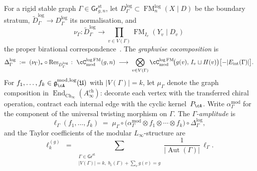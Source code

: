 \begin{construction}
\label{const:vol1-graphwise-log-fm-cocomposition}
For a rigid stable graph
$\Gamma\in \mathsf{Gr}^{\mathrm{st}}_{g,n}$, let
$D^{\log}_{\Gamma}\subset \operatorname{FM}^{\log}_n(X\mathbin{|}D)$
be the boundary stratum,
$\widetilde D^{\log}_{\Gamma}\to D^{\log}_{\Gamma}$ its
normalisation, and
\[
\nu_\Gamma\colon \widetilde D^{\log}_{\Gamma}\longrightarrow
\prod_{v\in V(\Gamma)}
\operatorname{FM}_{I_v}(Y_v\mathbin{|}D_v)
\]
the proper birational correspondence~\cite[Cor~5.3.4]{Mok25}.
The \emph{graphwise cocomposition} is
\begin{equation}
\label{eq:graphwise-log-cocomposition}
\Delta^{\log}_{\Gamma}
\;:=\;
(\nu_\Gamma)_*\circ \operatorname{Res}_{D^{\log}_{\Gamma}}
\;\colon\;
\cC^{\log\mathrm{FM}}_{\mathrm{mod}}(g,n)
\;\longrightarrow\;
\bigotimes_{v\in V(\Gamma)}
\cC^{\log\mathrm{FM}}_{\mathrm{mod}}\!\bigl(g(v),\,I_v\sqcup H(v)\bigr)
\bigl[-|E_{\mathrm{int}}(\Gamma)|\bigr].
\end{equation}
For $f_1,\dots,f_k\in
\mathfrak{g}^{\mathrm{mod},\log}_{\cA}(\mathfrak{U})$ with
$|V(\Gamma)|=k$, let $\mu_\Gamma$ denote the graph composition in
$\operatorname{End}_{\mathrm{Ch}_\infty}(A^{\mathrm{ch}}_\infty)$:
decorate each vertex with the transferred chiral operation,
contract each internal edge with the cyclic kernel~$P_\cA$.
Write $\alpha^{\mathrm{mod}}_\Gamma$ for the component of the
universal twisting morphism on $\Gamma$.  The
\emph{$\Gamma$-amplitude} is
\begin{equation}
\label{eq:graphwise-gamma-amplitude}
\ell_\Gamma(f_1,\dots,f_k)
\;=\;
\mu_\Gamma\circ
\bigl(\alpha^{\mathrm{mod}}_\Gamma\otimes f_1\otimes\cdots\otimes f_k\bigr)
\circ
\Delta^{\log}_{\Gamma},
\end{equation}
and the Taylor coefficients of the modular $L_\infty$-structure are
\begin{equation}
\label{eq:graphwise-taylor-coefficients}
\ell_k^{(g)}
\;=\;
\sum_{\substack{
\Gamma\in \mathsf{Gr}^{\mathrm{st}}\\
|V(\Gamma)|=k,\;
b_1(\Gamma)+\sum_v g(v)=g}}
\frac{1}{|\operatorname{Aut}(\Gamma)|}\,
\ell_\Gamma.
\end{equation}
\end{construction}

